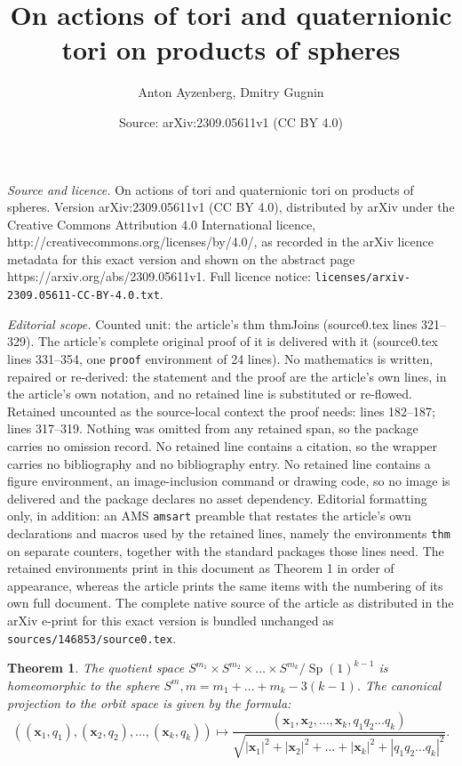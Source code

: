 \documentclass[10pt,a4paper]{amsart}
\title{On actions of tori and quaternionic tori on products of spheres}
\author{Anton Ayzenberg, Dmitry Gugnin}
\date{Source: arXiv:2309.05611v1 (CC BY 4.0)}
\newtheorem{thm}{Theorem}
\DeclareMathOperator{\Sp}{Sp}
\newcommand{\xb}{\mathbf{x}}
\begin{document}
\maketitle

\noindent\emph{Source and licence.} On actions of tori and quaternionic tori on products of spheres. Version arXiv:2309.05611v1 (CC BY 4.0), distributed by arXiv under the Creative Commons Attribution 4.0 International licence, http://creativecommons.org/licenses/by/4.0/, as recorded in the arXiv licence metadata for this exact version and shown on the abstract page https://arxiv.org/abs/2309.05611v1. Full licence notice: \texttt{licenses/arxiv-2309.05611-CC-BY-4.0.txt}.\par\smallskip

\noindent\textit{Editorial scope.} Counted unit: the article's thm thmJoins (source0.tex lines 321--329). The article's complete original proof of it is delivered with it (source0.tex lines 331--354, one \texttt{proof} environment of 24 lines). No mathematics is written, repaired or re-derived: the statement and the proof are the article's own lines, in the article's own notation, and no retained line is substituted or re-flowed.  Retained uncounted as the source-local context the proof needs: lines 182--187; lines 317--319.  Nothing was omitted from any retained span, so the package carries no omission record.  No retained line contains a citation, so the wrapper carries no bibliography and no bibliography entry.  No retained line contains a figure environment, an image-inclusion command or drawing code, so no image is delivered and the package declares no asset dependency.  Editorial formatting only, in addition: an AMS \texttt{amsart} preamble that restates the article's own declarations and macros used by the retained lines, namely the environments \texttt{thm} on separate counters, together with the standard packages those lines need.  The retained environments print in this document as Theorem 1 in order of appearance, whereas the article prints the same items with the numbering of its own full document.  The complete native source of the article as distributed in the arXiv e-print for this exact version is bundled unchanged as \texttt{sources/146853/source0.tex}.
\begin{thm}\label{thmQuaternionic}
The quotient space $S^{m_1}\times S^{m_2}\times \ldots \times S^{m_k}/\Sp(1)^{k-1}$ is homeomorphic to the sphere $S^m, m = m_1+\ldots + m_k - 3(k-1)$. The canonical projection to the orbit space is given by the formula:
\begin{equation}\label{eqTwoStars}
((\xb_1, q_1), (\xb_2, q_2), \ldots, (\xb_k, q_k)) \mapsto \frac{(\xb_1, \xb_2, \ldots, \xb_k, q_1q_2\ldots q_k)}{\sqrt{ |\xb_1|^2 + |\xb_2|^2 +  \ldots +  |\xb_k|^2 + |q_1q_2\ldots q_k|^2 }}.
\end{equation}
\end{thm}
\end{document}
